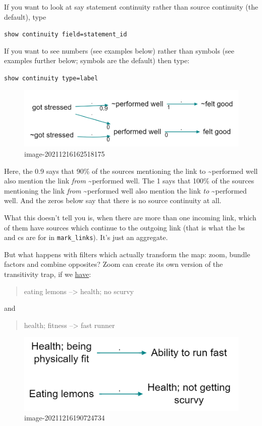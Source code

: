 \documentclass[
]{book}
\begin{document}
If you want to look at say statement continuity rather than source continuity (the default), type

\texttt{show\ continuity\ field=statement\_id}

If you want to see numbers (see examples below) rather than symbols (see examples further below; symbols are the default) then type:

\texttt{show\ continuity\ type=label}

\begin{figure}
\centering
\includegraphics[width=6.77083in,height=\textheight]{_assets/image-20211216162518175.png}
\caption{image-20211216162518175}
\end{figure}

Here, the 0.9 says that 90\% of the sources mentioning the link to \textasciitilde performed well also mention the link \emph{from} \textasciitilde performed well. The 1 says that 100\% of the sources mentioning the link \emph{from} \textasciitilde performed well also mention the link \emph{to} \textasciitilde performed well. And the zeros below say that there is no source continuity at all.

What this doesn't tell you is, when there are more than one incoming link, which of them have sources which continue to the outgoing link (that is what the bs and cs are for in \texttt{mark\_links}). It's just an aggregate.

But what happens with filters which actually transform the map: zoom, bundle factors and combine opposites? Zoom can create its own version of the transitivity trap, if we \href{https://causalmap.shinyapps.io/CM2test/?s=415}{have}:

\begin{quote}
eating lemons --\textgreater{} health; no scurvy
\end{quote}

and

\begin{quote}
health; fitness --\textgreater{} fast runner
\end{quote}

\begin{figure}
\centering
\includegraphics[width=6.77083in,height=\textheight]{_assets/image-20211216190724734.png}
\caption{image-20211216190724734}
\end{figure}
\end{document}
